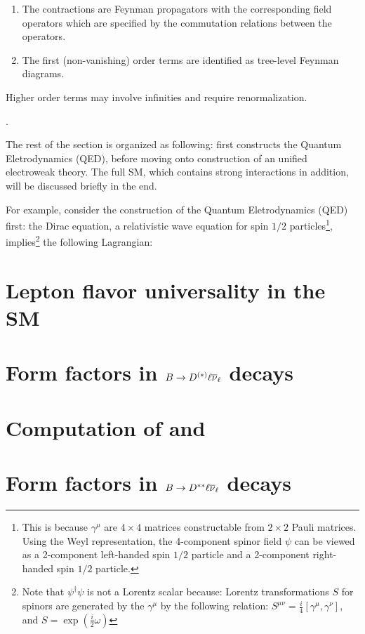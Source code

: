 {\begin{enumerate}
        \item The contractions are Feynman propagators with the
            corresponding field operators which are specified by the commutation
            relations between the operators.

        \item The first (non-vanishing) order terms are identified as tree-level
            Feynman diagrams.
    \end{enumerate}
    Higher order terms may involve infinities and require renormalization.
}.

The rest of the section is organized as following:
first constructs the Quantum Eletrodynamics (QED),
before moving onto construction of an unified electroweak theory.
The full SM, which contains strong interactions in addition,
will be discussed briefly in the end.

For example, consider the construction of the Quantum Eletrodynamics (QED)
first:
the Dirac equation, a relativistic wave equation for spin $1/2$ particles\footnote{
    This is because $\gamma^\mu$ are $4 \times 4$ matrices constructable from
    $2 \times 2$ Pauli matrices.
    Using the Weyl representation, the 4-component spinor field $\psi$ can
    be viewed as a 2-component left-handed spin $1/2$ particle and a 2-component
    right-handed spin $1/2$ particle.
}, implies\footnote{
    Note that $\psi^\dagger \psi$ is not a Lorentz scalar because:
    Lorentz transformations $S$ for spinors are generated by
    the $\gamma^\mu$ by the following relation:
    $S^{\mu\nu} = \frac{i}{4}[\gamma^\mu, \gamma^\nu]$,
    and $S = \exp(\frac{i}{2}\omega)$
} the following Lagrangian:


\section{Lepton flavor universality in the SM}
\label{ref:theory:lfu}


\section{Form factors in $B \rightarrow D^{(*)}\ell{\ensuremath{{\overline{\nu}}_\ell}}$ decays}
\label{ref:theory:ff-d0-dst}


\section{Computation of \RD and \RDst}
\label{ref:theory:rdx}


\section{Form factors in $B \rightarrow D^{**}\ell{\ensuremath{{\overline{\nu}}_\ell}}$ decays}
\label{ref:theory:ff-dstst}
